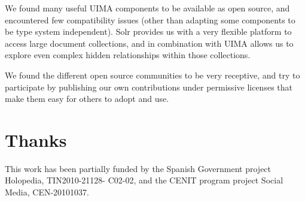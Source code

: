\documentclass{llncs}
\begin{document}
We found many useful UIMA components to be available as open source, and encountered few compatibility issues (other than adapting some components to be type system independent). Solr provides us with a very flexible platform to access large document collections, and in combination with UIMA allows us to explore even complex hidden relationships within those collections.

We found the different open source communities to be very receptive, and try to participate by publishing our own contributions under permissive licenses that make them easy for others to adopt and use.

\section{Thanks}
This work has been partially funded by the Spanish
Government project Holopedia, TIN2010-21128-
C02-02, and the CENIT program project Social Media,
CEN-20101037.
\end{document}
